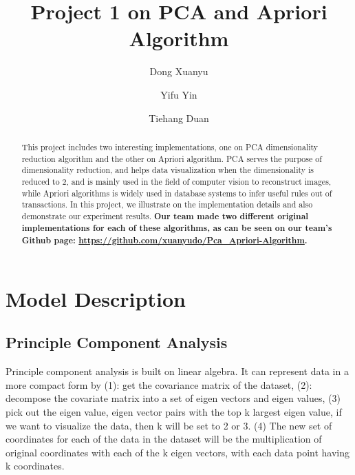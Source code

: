 \documentclass[fleqn]{llncs}
\title{Project 1 on PCA and Apriori Algorithm}
\begin{document}
	\author{Dong Xuanyu \and Yifu Yin \and Tiehang Duan}
	\setcounter{page}{1}
	\maketitle
	\thispagestyle{plain}
	\pagestyle{plain}


	\begin{abstract}
	This project includes two interesting implementations, one on PCA dimensionality reduction algorithm and the other on Apriori algorithm. PCA serves the purpose of dimensionality reduction, and helps data visualization when the dimensionality is reduced to 2, and is mainly used in the field of computer vision to reconstruct images, while Apriori algorithms is widely used in database systems to infer useful rules out of transactions. In this project, we illustrate on the implementation details and also demonstrate our experiment results. \textbf{Our team made two different original implementations for each of these algorithms, as can be seen on our team's Github page: \url{https://github.com/xuanyudo/Pca_Apriori-Algorithm}.}
	
	 
	\end{abstract}

\section{Model Description}

\subsection{Principle Component Analysis} Principle component analysis is built on linear algebra. It can represent data in a more compact form by (1): get the covariance matrix of the dataset, (2): decompose the covariate matrix into a set of eigen vectors and eigen values, (3) pick out the {eigen value, eigen vector} pairs with the top k largest eigen value, if we want to visualize the data, then k will be set to 2 or 3. (4) The new set of coordinates for each of the data in the dataset will be the multiplication of original coordinates with each of the k eigen vectors, with each data point having k coordinates.
\end{document}
